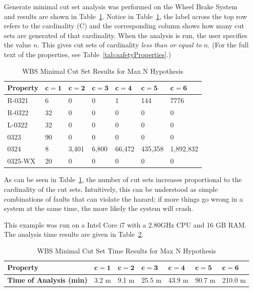 Generate minimal cut set analysis was performed on the Wheel Brake System and results are shown in Table~\ref{tab:wbs_maxN_results}. Notice in Table~\ref{tab:wbs_maxN_results}, the label across the top row refers to the cardinality (C) and the corresponding column shows how many cut sets are generated of that cardinality. When the analysis is run, the user specifies the value $n$. This gives cut sets of cardinality \textit{less than or equal to} $n$. (For the full text of the properties, see Table~\ref{tab:safetyProperties}.)

\begin{center}
\begin{table}[htbp]
    \begin{tabular}{ | l | l | l | l | l | l | l |}
    \hline
    \textbf{Property} & $\bm{c = 1}$ & $\bm{c = 2}$ & $\bm{c = 3}$ & $\bm{c = 4}$ 
		& $\bm{c = 5}$ & $\bm{c = 6}$   \\ \hline \hline
    R-0321 & 6 & 0 & 0 & 1& 144&7776  \\ \hline
    R-0322 & 32 & 0 & 0 &0 &0 &0 \\ \hline
    L-0322 & 32 & 0 & 0 &0 &0 &0  \\ \hline
    0323 & 90 & 0 & 0 &0 &0 &0 \\ \hline
    0324 & 8 & 3,401 & 6,800 &66,472 & 435,358&1,892,832 \\ \hline
    0325-WX & 20 & 0 & 0 &0 &0 & 0\\ \hline
    \end{tabular}
    \caption{WBS Minimal Cut Set Results for Max N Hypothesis}
    \label{tab:wbs_maxN_results}
\end{table}
\end{center}

As can be seen in Table~\ref{tab:wbs_maxN_results}, the number of cut sets increases proportional to the cardinality of the cut sets. Intuitively, this can be understood as simple combinations of faults that can violate the hazard; if more things go wrong in a system at the same time, the more likely the system will crash. 

This example was run on a Intel Core i7 with a 2.80GHz CPU and 16 GB RAM. The analysis time results are given in Table~\ref{tab:analysisTimeWBS}. 

\begin{center}
\begin{table}[htbp]
    \begin{tabular}{ | l | l | l | l | l | l | l |}
    \hline
    \textbf{Property} & $\bm{c = 1}$ & $\bm{c = 2}$ & $\bm{c = 3}$ & $\bm{c = 4}$ 
		& $\bm{c = 5}$ & $\bm{c = 6}$   \\ \hline \hline
    \textbf{Time of Analysis (min)} & 3.2 m & 9.1 m & 25.5 m & 43.9 m & 90.7 m & 210.0 m  \\ \hline
    \end{tabular}
    \caption{WBS Minimal Cut Set Time Results for Max N Hypothesis}
    \label{tab:analysisTimeWBS}
\end{table}
\end{center}

